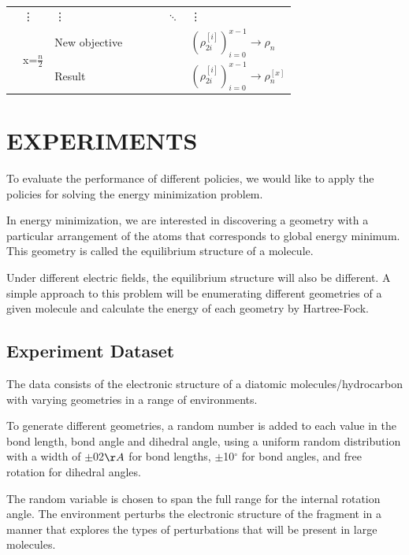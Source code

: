\documentclass[twoside]{article}
\begin{document}
\begin{center}
\begin{table}[t]
\begin{tabular}{|l|l|l|l|l|l|l|l|}
	& \vdots      & \vdots      &                &                &                & $\ddots$ &   \vdots \\ \cline{2-8} 
	& \multirow{2}{*}{ x=$\frac{n}{2}$} & New objective         &                         &                          &                            &  & $(\rho_{2i}^{[i]})_{i=0}^{x-1} \rightarrow \rho_{n}$     \\ \cline{3-8} 
	&                & Result  &                &                &                &  & $(\rho_{2i}^{[i]})_{i=0}^{x-1}\rightarrow \rho_{n}^{[x]}$ \\ \hline
	\end{tabular}
	\end{table}
\end{center} 



\section{EXPERIMENTS}

To evaluate the performance of different policies, we would like to apply the policies for solving the energy minimization problem.

In energy minimization, we are interested in discovering a geometry with a particular arrangement of the atoms that corresponds to global energy minimum. This geometry is called the equilibrium structure of a molecule.

Under different electric fields, the equilibrium structure will also be different. A simple approach to this problem will be enumerating different geometries of a given molecule and calculate the energy of each geometry by Hartree-Fock. 

 
\subsection{Experiment Dataset}

The data consists of the electronic structure of a diatomic molecules/hydrocarbon with varying geometries in a range of environments. 

To generate different geometries,
a random number is added to each value in the bond length, bond angle and dihedral angle, using a uniform random distribution with a width of $\pm$02$\AA$ for bond lengths,  $\pm$10$^{\circ}$ for bond angles, and free rotation for dihedral angles. 

The random variable is chosen to span the full range for the internal rotation angle. The environment perturbs the electronic structure of the fragment in a manner that explores the types of perturbations that will be present in large molecules. 
\end{document}

